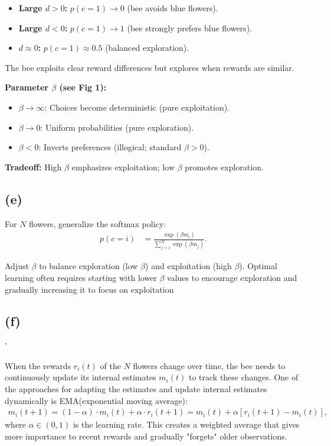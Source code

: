 \documentclass{article}
\begin{document}
\begin{itemize}
    \item \textbf{Large \(d > 0\):} \(p(c=1) \to 0\) (bee avoids blue flowers).
    \item \textbf{Large \(d < 0\):} \(p(c=1) \to 1\) (bee strongly prefers blue flowers).
    \item \textbf{\(d \approx 0\):} \(p(c=1) \approx 0.5\) (balanced exploration).
\end{itemize}
The bee exploits clear reward differences but explores when rewards are similar.

\textbf{Parameter \(\beta\) (see Fig 1): }
\begin{itemize}
    \item \(\beta \to \infty\): Choices become deterministic (pure exploitation).
    \item \(\beta \to 0\): Uniform probabilities (pure exploration).
    \item \(\beta < 0\): Inverts preferences (illogical; standard \(\beta > 0\)).
\end{itemize}
\textbf{Tradeoff:} High \(\beta\) emphasizes exploitation; low \(\beta\) promotes exploration.

\subsection*{(e)}
For \(N\) flowers, generalize the softmax policy:
\begin{align}
p(c=i) &= \frac{\exp(\beta m_i)}{\sum_{j=1}^N \exp(\beta m_j)}.
\end{align}

Adjust \(\beta\) to balance exploration (low \(\beta\)) and exploitation (high \(\beta\)). 
Optimal learning often requires starting with lower $\beta$ values to encourage exploration and gradually increasing it to focus on exploitation

\subsection*{(f)}'




When the rewards $r_i(t)$ of the $N$ flowers change over time, the bee needs to continuously update its internal estimates $m_i(t)$ to track these changes. One of the approaches for adapting the estimates and update internal estimates dynamically is EMA(exponential moving average):
\begin{align}
m_i(t+1) = (1-\alpha) \cdot m_i(t) + \alpha \cdot r_i(t+1) = m_i(t) + \alpha \left[r_i(t+1) - m_i(t)\right],
\end{align}
where \(\alpha \in (0,1)\) is the learning rate. This creates a weighted average that gives more importance to recent rewards and gradually "forgets" older observations.
\end{document}
